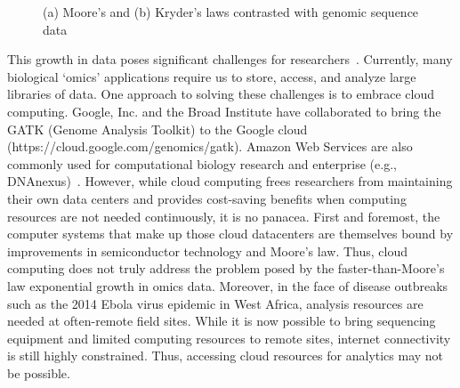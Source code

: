 \documentclass{acm_proc_article-sp}
\begin{document}
\begin{figure}[htb!]
\centering
{}
\caption[Sequencing vs. Storage]{(a) Moore's and (b) Kryder's laws contrasted with genomic sequence data}
\label{fig:growth}
\end{figure}

This growth in data poses significant challenges for 
researchers~\cite{marx2013biology}.
Currently, many biological `omics' applications require us to store, access, 
and analyze large libraries of data.
One approach to solving these challenges is to embrace cloud computing.
Google, Inc. and the Broad Institute have collaborated to bring the GATK 
(Genome 
Analysis Toolkit) to the Google cloud (https://cloud.google.com/genomics/gatk).
Amazon Web Services are also commonly used for computational biology 
research and enterprise (e.g., DNAnexus)~\cite{schatz2010cloud}.
However, while cloud computing frees researchers from maintaining their own
data centers and provides cost-saving benefits when computing resources are
not needed continuously, it is no panacea.
First and foremost, the computer systems that make up those cloud datacenters
are themselves bound by improvements in semiconductor technology and Moore's
law. Thus, cloud computing does not truly address the problem posed by the
faster-than-Moore's law exponential growth in omics data.
Moreover, in the face of disease outbreaks such as the 2014 Ebola virus epidemic 
in West Africa, analysis resources are needed at often-remote field sites.
While it is now possible to bring sequencing equipment and limited computing 
resources to remote sites, internet connectivity is still highly constrained.
Thus, accessing cloud resources for analytics may not be possible.
\end{document}
